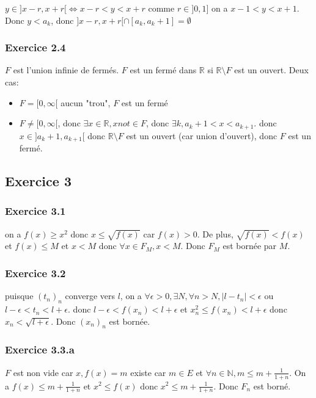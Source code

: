 \documentclass[]{book}
\theoremstyle{definition}
\newcommand{\bb}[1]{\mathbb{#1}}
\newcommand{\R}{\bb{R}}
\newcommand{\N}{\bb{N}}
\begin{document}
$y \in ]x-r, x+r[ \Leftrightarrow x-r < y < x+r$ comme $r \in ]0,1]$ on a $x-1 < y < x+1$.\\

Donc $y < a_k$, donc $]x-r, x+r[ \cap [a_k, a_k+1] = \emptyset$

\subsubsection*{Exercice 2.4}
$F$ est l'union infinie de ferm\'es. $F$ est un ferm\'e dans $\R$ si $\R \setminus F$ est un ouvert. Deux cas:
\begin{itemize}
\item $F=[0,\infty[$ aucun "trou", $F$ est un ferm\'e
\item $F\neq[0,\infty[$, donc $\exists x \in \R, x not\in F$, donc $\exists k, a_k+1 < x < a_{k+1}$. donc $x \in ]a_k+1, a_{k+1}[$ donc $\R \setminus F$ est un ouvert (car union d'ouvert), donc $F$ est un ferm\'e.
\end{itemize}


\subsection*{Exercice 3}
\subsubsection*{Exercice 3.1}
on a $f(x) \geq x^2$ donc $x \leq \sqrt{f(x)}$ car $f(x) > 0$. De plus, $\sqrt{f(x)} < f(x)$ et $f(x) \leq M$ et $x < M$ donc $\forall x \in F_M, x < M$. Donc $F_M$ est born\'ee par $M$.
 
\subsubsection*{Exercice 3.2}
puisque $(t_n)_n$ converge vers $l$, on a $\forall \epsilon >0, \exists N, \forall n > N, |l-t_n| < \epsilon$ ou $l-\epsilon < t_n < l+\epsilon$. donc $l-\epsilon < f(x_n) < l+\epsilon$ et $x_n^2 \leq f(x_n) < l+\epsilon$ donc $x_n < \sqrt{l+\epsilon}$. Donc $(x_n)_n$ est born\'ee.

\subsubsection*{Exercice 3.3.a}
$F$ est non vide car $x, f(x) = m$ existe car $m \in E$ et $\forall n \in \N, m \leq m + \frac{1}{1+n}$. On a $f(x) \leq m + \frac{1}{1+n}$ et $x^2 \leq f(x)$ donc $x^2 \leq m + \frac{1}{1+n}$. Donc $F_n$ est born\'e. 
\end{document}
